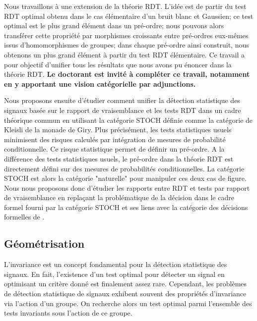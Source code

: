 \documentclass[a4paper, 10pt]{article}
\begin{document}
Nous travaillons à une extension de la théorie RDT. L'idée est de partir du test RDT optimal obtenu dans le cas élémentaire d'un bruit blanc et Gaussien; ce test optimal est le plus grand élément dans un pré-ordre; nous pouvons alors transférer cette propriété par morphismes croissants entre pré-ordres eux-mêmes issus d'homomorphismes de groupes; dans chaque pré-ordre ainsi construit, nous obtenons un plus grand élément à partir du test RDT élémentaire. Ce travail a pour objectif d'unifier tous les résultats que nous avons pu énoncer dans la théorie RDT. \textbf{Le doctorant est invité à compléter ce travail, notamment en y apportant une vision catégorielle par adjunctions.}

Nous proposons ensuite d'étudier comment unifier la détection statistique des signaux basée sur le rapport de vraisemblance et les tests RDT dans un cadre théorique commun en utilisant la catégorie STOCH définie comme la catégorie de Kleisli de la monade de Giry. Plus précisément, les tests statistiques usuels minimisent des risques calculés par intégration de mesures de probabilité conditionnelle. Ce risque statistique permet de définir un pré-ordre. A la différence des tests statistiques usuels, le pré-ordre dans la théorie RDT est directement défini sur des mesures de probabilités conditionnelles. La catégorie STOCH est alors la catégorie "naturelle" pour manipuler ces deux cas de figure. Nous nous proposons donc d'étudier les rapports entre RDT et tests par rapport de vraisemblance en replaçant la problématique de la décision dans le cadre formel fourni par la catégorie STOCH et ses liens avec la catégorie des décisions formelles de \cite{cencov2000statistical}. %

\subsection{Géométrisation}

L'invariance est un concept fondamental pour la détection statistique des signaux. En fait, l'existence d'un test optimal pour détecter un signal en optimisant un critère donné est finalement assez rare. Cependant, les problèmes de détection statistique de signaux exhibent souvent des propriétés d'invariance via l'action d'un groupe. On recherche alors un test optimal parmi l'ensemble des tests invariants sous l'action de ce groupe. %
\end{document}
